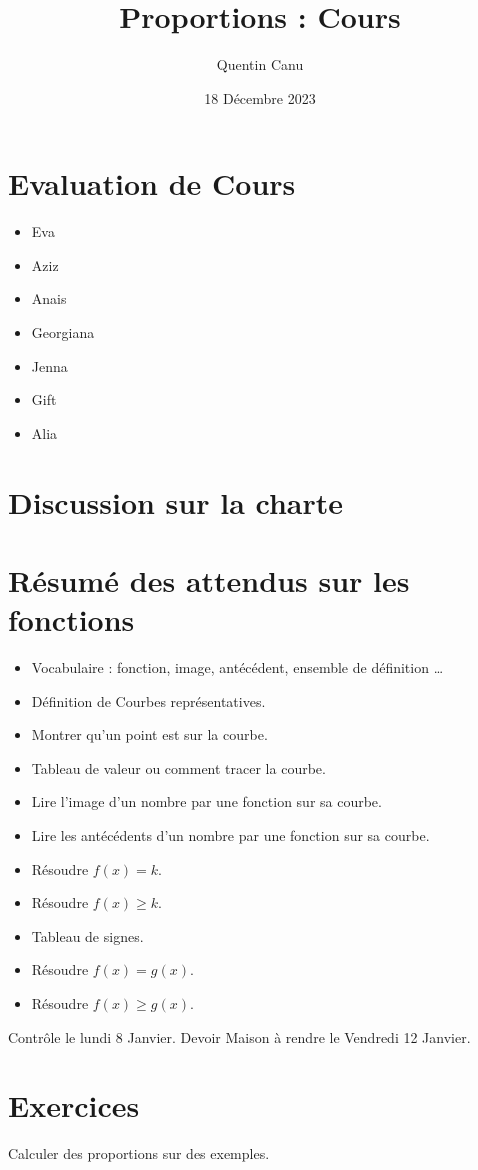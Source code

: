 \documentclass{article}
\title{Proportions : Cours}
\date{18 Décembre 2023}
\author{Quentin Canu}
\begin{document}
\maketitle
\section{Evaluation de Cours}
\begin{itemize}
\item Eva
\item Aziz
\item Anais
\item Georgiana
\item Jenna
\item Gift
\item Alia
\end{itemize}
\section{Discussion sur la charte}
\section{Résumé des attendus sur les fonctions}
\begin{itemize}
\item Vocabulaire : fonction, image, antécédent, ensemble de définition \dots
\item Définition de Courbes représentatives.
\item Montrer qu'un point est sur la courbe.
\item Tableau de valeur ou comment tracer la courbe.
\item Lire l'image d'un nombre par une fonction sur sa courbe.
\item Lire les antécédents d'un nombre par une fonction sur sa courbe.
\item Résoudre $f(x) = k$.
\item Résoudre $f(x) \geq k$.
\item Tableau de signes.
\item Résoudre $f(x) = g(x)$.
\item Résoudre $f(x) \geq g(x)$.
\end{itemize}
Contrôle le lundi 8 Janvier.
Devoir Maison à rendre le Vendredi 12 Janvier.
\section{Exercices}
Calculer des proportions sur des exemples.
\end{document}
